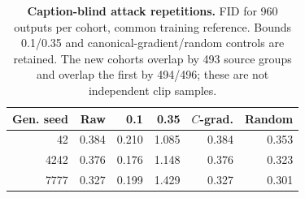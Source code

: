 \begin{table}[t]
\centering\footnotesize
\caption{\textbf{Caption-blind attack repetitions.} FID for 960 outputs per cohort, common training reference. Bounds 0.1/0.35 and canonical-gradient/random controls are retained. The new cohorts overlap by 493 source groups and overlap the first by 494/496; these are not independent clip samples.}
\label{tab:blindreps}
\begin{tabular}{rrrrrr}\toprule
Gen. seed&Raw&0.1&0.35&$C$-grad.&Random\\\midrule
42&0.384&0.210&1.085&0.384&0.353\\
4242&0.376&0.176&1.148&0.376&0.323\\
7777&0.327&0.199&1.429&0.327&0.301\\
\bottomrule\end{tabular}\end{table}
